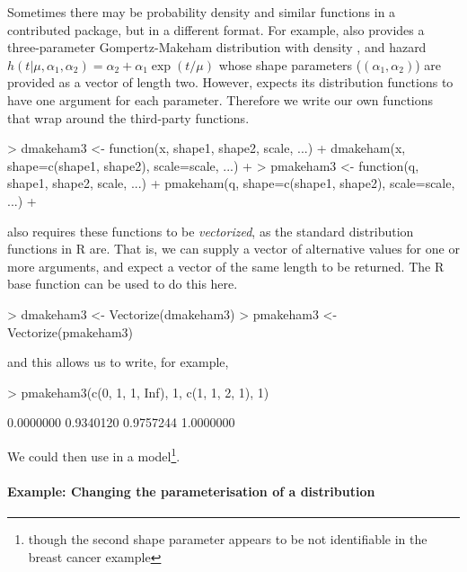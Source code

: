 \documentclass[nojss,nofooter]{jss}
\begin{document}
Sometimes there may be probability density and similar functions in a
contributed package, but in a different format.  For example,
 also provides a three-parameter Gompertz-Makeham
distribution with density , and 
hazard $h(t|\mu,\alpha_1,\alpha_2)= \alpha_2 + \alpha_1 \exp(t/\mu)$
whose shape parameters ($(\alpha_1,\alpha_2)$) are
provided as a vector of length two.  However, 
expects its distribution functions to have one argument for each
parameter.  Therefore we write our own functions that wrap around 
the third-party functions.
\begin{Schunk}
\begin{Sinput}
> dmakeham3 <- function(x, shape1, shape2, scale, ...)  {
+     dmakeham(x, shape=c(shape1, shape2), scale=scale, ...)
+ }
> pmakeham3 <- function(q, shape1, shape2, scale, ...)  {
+     pmakeham(q, shape=c(shape1, shape2), scale=scale, ...)
+ }
\end{Sinput}
\end{Schunk}
 also requires these functions to be
\emph{vectorized}, as the standard distribution functions in R are.
That is, we can supply a vector of alternative values for one or more
arguments, and expect a vector of the same length to be returned.  The
R base function  can be used to do this here.
\begin{Schunk}
\begin{Sinput}
> dmakeham3 <- Vectorize(dmakeham3) 
> pmakeham3 <- Vectorize(pmakeham3)
\end{Sinput}
\end{Schunk}
and this allows us to write, for example, 
\begin{Schunk}
\begin{Sinput}
> pmakeham3(c(0, 1, 1, Inf), 1, c(1, 1, 2, 1), 1)
\end{Sinput}
\begin{Soutput}
[1] 0.0000000 0.9340120 0.9757244 1.0000000
\end{Soutput}
\end{Schunk}
We could then use 
in a  model\footnote{though the second shape parameter appears to be not 
  identifiable in the breast cancer example}. 


\paragraph{Example: Changing the parameterisation of a distribution}
\end{document}
